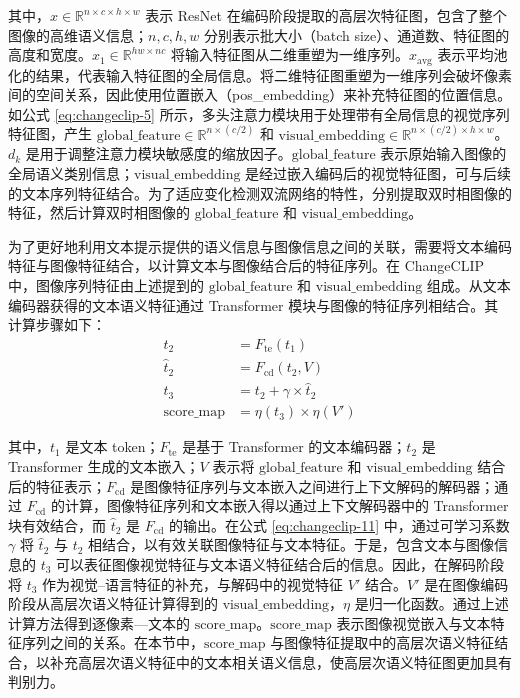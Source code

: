 其中，$x\in\mathbb{R}^{n\times c\times h\times w}$ 表示 ResNet 在编码阶段提取的高层次特征图，包含了整个图像的高维语义信息；$n,c,h,w$ 分别表示批大小（batch size）、通道数、特征图的高度和宽度。$x_1\in\mathbb{R}^{hw\times nc}$ 将输入特征图从二维重塑为一维序列。$x_{\mathrm{avg}}$ 表示平均池化的结果，代表输入特征图的全局信息。将二维特征图重塑为一维序列会破坏像素间的空间关系，因此使用位置嵌入（pos\_embedding）来补充特征图的位置信息。如公式 \eqref{eq:changeclip-5} 所示，多头注意力模块用于处理带有全局信息的视觉序列特征图，产生 $\mathrm{global\_feature}\in\mathbb{R}^{n\times (c/2)}$ 和 $\mathrm{visual\_embedding}\in\mathbb{R}^{n\times (c/2)\times h\times w}$。$d_k$ 是用于调整注意力模块敏感度的缩放因子。$\mathrm{global\_feature}$ 表示原始输入图像的全局语义类别信息；$\mathrm{visual\_embedding}$ 是经过嵌入编码后的视觉特征图，可与后续的文本序列特征结合。为了适应变化检测双流网络的特性，分别提取双时相图像的特征，然后计算双时相图像的 $\mathrm{global\_feature}$ 和 $\mathrm{visual\_embedding}$。

为了更好地利用文本提示提供的语义信息与图像信息之间的关联，需要将文本编码特征与图像特征结合，以计算文本与图像结合后的特征序列。在 ChangeCLIP 中，图像序列特征由上述提到的 \(\mathrm{global\_feature}\) 和 \(\mathrm{visual\_embedding}\) 组成。从文本编码器获得的文本语义特征通过 Transformer 模块与图像的特征序列相结合。其计算步骤如下：
\begin{align}
t_2 &= F_{\mathrm{te}}(t_1) \label{eq:changeclip-9}\\
\hat t_2 &= F_{\mathrm{cd}}(t_2, V) \label{eq:changeclip-10}\\
t_3 &= t_2 + \gamma \times \hat t_2 \label{eq:changeclip-11}\\
\mathrm{score\_map} &= \eta(t_3)\times \eta(V') \label{eq:changeclip-12}
\end{align}

其中，\(t_1\) 是文本 token；\(F_{\mathrm{te}}\) 是基于 Transformer 的文本编码器；\(t_2\) 是 Transformer 生成的文本嵌入；\(V\) 表示将 \(\mathrm{global\_feature}\) 和 \(\mathrm{visual\_embedding}\) 结合后的特征表示；\(F_{\mathrm{cd}}\) 是图像特征序列与文本嵌入之间进行上下文解码的解码器；通过 \(F_{\mathrm{cd}}\) 的计算，图像特征序列和文本嵌入得以通过上下文解码器中的 Transformer 块有效结合，而 \(\hat t_2\) 是 \(F_{\mathrm{cd}}\) 的输出。在公式 \eqref{eq:changeclip-11} 中，通过可学习系数 \(\gamma\) 将 \(\hat t_2\) 与 \(t_2\) 相结合，以有效关联图像特征与文本特征。于是，包含文本与图像信息的 \(t_3\) 可以表征图像视觉特征与文本语义特征结合后的信息。因此，在解码阶段将 \(t_3\) 作为视觉–语言特征的补充，与解码中的视觉特征 \(V'\) 结合。\(V'\) 是在图像编码阶段从高层次语义特征计算得到的 \(\mathrm{visual\_embedding}\)，\(\eta\) 是归一化函数。通过上述计算方法得到逐像素—文本的 \(\mathrm{score\_map}\)。\(\mathrm{score\_map}\) 表示图像视觉嵌入与文本特征序列之间的关系。在本节中，\(\mathrm{score\_map}\) 与图像特征提取中的高层次语义特征结合，以补充高层次语义特征中的文本相关语义信息，使高层次语义特征图更加具有判别力。

